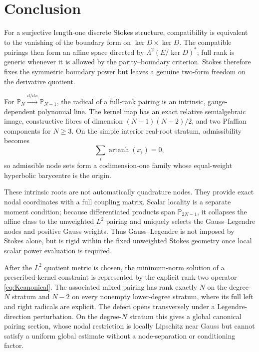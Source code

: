 \documentclass[11pt,a4paper]{article}
\theoremstyle{definition}
\theoremstyle{remark}
\newcommand{\Pp}{\mathbb{P}}
\newcommand{\Ker}{\operatorname{ker}}
\begin{document}
\section{Conclusion}

For a surjective length-one discrete Stokes structure, compatibility is equivalent to the
vanishing of the boundary form on $\Ker D\times\Ker D$.  The compatible pairings then form
an affine space directed by $\Lambda^2(E/\Ker D)^*$; full rank is generic whenever it is
allowed by the parity--boundary criterion.  Stokes therefore fixes the symmetric boundary
power but leaves a genuine two-form freedom on the derivative quotient.

For $\Pp_N\xrightarrow{d/dx}\Pp_{N-1}$, the radical of a full-rank pairing is an intrinsic,
gauge-dependent polynomial line.  The kernel map has an exact relative semialgebraic image,
constructive fibres of dimension $(N-1)(N-2)/2$, and two Pfaffian components for $N\geq3$.
On the simple interior real-root stratum, admissibility becomes
\[
 \sum_i\operatorname{artanh}(x_i)=0,
\]
so admissible node sets form a codimension-one family whose equal-weight hyperbolic
barycentre is the origin.

These intrinsic roots are not automatically quadrature nodes.  They provide exact nodal
coordinates with a full coupling matrix.  Scalar locality is a separate moment condition;
because differentiated products span $\Pp_{2N-1}$, it collapses the affine class to the
unweighted $L^2$ pairing and uniquely selects the Gauss--Legendre nodes and positive Gauss
weights.  Thus Gauss--Legendre is not imposed by Stokes alone, but is rigid within the fixed
unweighted Stokes geometry once local scalar power evaluation is required.

After the $L^2$ quotient metric is chosen, the minimum-norm solution of a prescribed-kernel
constraint is represented by the explicit rank-two operator \eqref{eq:Kcanonical}.  The
associated mixed pairing has rank exactly $N$ on the degree-$N$ stratum and $N-2$ on every
nonempty lower-degree stratum, where its full left and right radicals are explicit.  The
defect opens transversely under a Legendre-direction perturbation.  On the degree-$N$
stratum this gives a global canonical pairing section, whose nodal restriction is locally
Lipschitz near Gauss but cannot satisfy a uniform global estimate without a node-separation
or conditioning factor.
\end{document}
